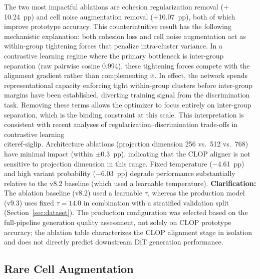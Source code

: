 \documentclass[preprint,12pt]{elsarticle}
\begin{document}
The two most impactful ablations are cohesion regularization removal ($+$10.24~pp) and cell noise augmentation removal ($+$10.07~pp), both of which improve prototype accuracy. This counterintuitive result has the following mechanistic explanation: both cohesion loss and cell noise augmentation act as within-group tightening forces that penalize intra-cluster variance. In a contrastive learning regime where the primary bottleneck is inter-group separation (raw pairwise cosine 0.994), these tightening forces compete with the alignment gradient rather than complementing it. In effect, the network spends representational capacity enforcing tight within-group clusters before inter-group margins have been established, diverting training signal from the discrimination task. Removing these terms allows the optimizer to focus entirely on inter-group separation, which is the binding constraint at this scale. This interpretation is consistent with recent analyses of regularization--discrimination trade-offs in contrastive learning~\\cite{ref-siglip}. Architecture ablations (projection dimension 256 vs.\ 512 vs.\ 768) have minimal impact (within $\pm$0.3~pp), indicating that the CLOP aligner is not sensitive to projection dimension in this range. Fixed temperature ($-$4.61~pp) and high variant probability ($-$6.03~pp) degrade performance substantially relative to the v8.2 baseline (which used a learnable temperature). \textbf{Clarification:} The ablation baseline (v8.2) used a learnable $\tau$, whereas the production model (v9.3) uses fixed $\tau = 14.0$ in combination with a stratified validation split (Section~\ref{sec:dataset}). The production configuration was selected based on the full-pipeline generation quality assessment, not solely on CLOP prototype accuracy; the ablation table characterizes the CLOP alignment stage in isolation and does not directly predict downstream DiT generation performance.

\subsection{Rare Cell Augmentation}\label{sec:rare-cell}
\end{document}
